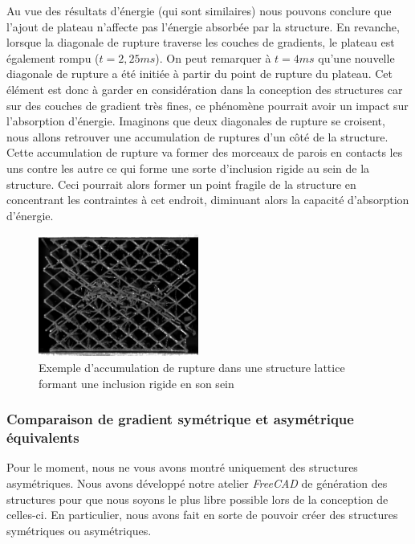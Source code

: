 \documentclass[a4paper]{article}
\begin{document}
	Au vue des résultats d'énergie (qui sont similaires) nous pouvons conclure que l'ajout de plateau n'affecte pas l'énergie absorbée par la structure. En revanche, lorsque la diagonale de rupture traverse les couches de gradients, le plateau est également rompu ($t=2,25 ms$). On peut remarquer à $t=4 ms$ qu'une nouvelle diagonale de rupture a été initiée à partir du point de rupture du plateau. Cet élément est donc à garder en considération dans la conception des structures car sur des couches de gradient très fines, ce phénomène pourrait avoir un impact sur l'absorption d'énergie. Imaginons que deux diagonales de rupture se croisent, nous allons retrouver une accumulation de ruptures d'un côté de la structure. Cette accumulation de rupture va former des morceaux de parois en contacts les uns contre les autre ce qui forme une sorte d'inclusion rigide au sein de la structure. Ceci pourrait alors former un point fragile de la structure en concentrant les contraintes à cet endroit, diminuant alors la capacité d’absorption d'énergie.
	
	\begin{figure}[H]
		\centering
		\includegraphics[height=4cm]{Images/7/7_4/7_4_3/inclusion.png}
		\caption{Exemple d'accumulation de rupture dans une structure lattice formant une inclusion rigide en son sein}
	\end{figure}
	\newpage
	
	\subsubsection{Comparaison de gradient symétrique et asymétrique équivalents}
	\label{res_grad_symasym}
	\hspace{0.5cm}Pour le moment, nous ne vous avons montré uniquement des structures asymétriques. Nous avons développé notre atelier \textit{FreeCAD} de génération des structures pour que nous soyons le plus libre possible lors de la conception de celles-ci. En particulier, nous avons fait en sorte de pouvoir créer des structures symétriques ou asymétriques.\\
	
\end{document}
